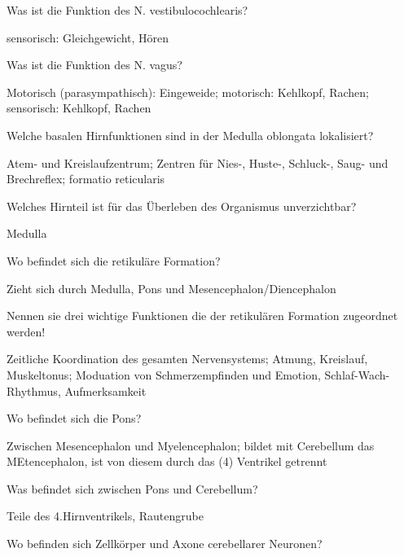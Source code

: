 \documentclass[10pt, a4paper]{exam}
\begin{document}
\begin{questions}
  \question Was ist die Funktion des N. vestibulocochlearis?
  \begin{solution}
    sensorisch: Gleichgewicht, Hören
  \end{solution}

  \question Was ist die Funktion des N. vagus?
  \begin{solution}
    Motorisch (parasympathisch): Eingeweide; motorisch: Kehlkopf, Rachen; sensorisch: Kehlkopf, Rachen
  \end{solution}

  \question Welche basalen Hirnfunktionen sind in der Medulla oblongata lokalisiert?
  \begin{solution}
    Atem- und Kreislaufzentrum; Zentren für Nies-, Huste-, Schluck-, Saug- und Brechreflex; formatio reticularis
  \end{solution}

  \question Welches Hirnteil ist für das Überleben des Organismus unverzichtbar?
  \begin{solution}
    Medulla
  \end{solution}

  \question Wo befindet sich die retikuläre Formation?
  \begin{solution}
    Zieht sich durch Medulla, Pons und Mesencephalon/Diencephalon
  \end{solution}

  \question Nennen sie drei wichtige Funktionen die der retikulären Formation zugeordnet werden!
  \begin{solution}
    Zeitliche Koordination des gesamten Nervensystems; Atmung, Kreislauf, Muskeltonus; Moduation von Schmerzempfinden und Emotion, Schlaf-Wach-Rhythmus, Aufmerksamkeit
  \end{solution}

  \question Wo befindet sich die Pons?
  \begin{solution}
    Zwischen Mesencephalon und Myelencephalon; bildet mit Cerebellum das MEtencephalon, ist von diesem durch das (4) Ventrikel getrennt
  \end{solution}

  \question Was befindet sich zwischen Pons und Cerebellum?
  \begin{solution}
    Teile des 4.Hirnventrikels, Rautengrube
  \end{solution}

  \question Wo befinden sich Zellkörper und Axone cerebellarer Neuronen?
  \begin{solution}


\end{solution}
\end{questions}
\end{document}
